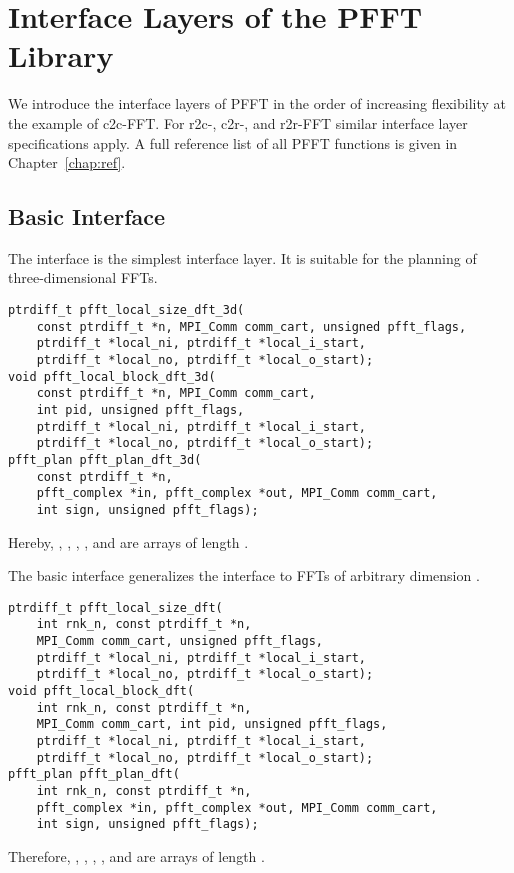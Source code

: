 \chapter{Interface Layers of the PFFT Library}\label{chap:api}
We introduce the interface layers of PFFT in the order of increasing flexibility at the example of c2c-FFT.
For r2c-, c2r-, and r2r-FFT similar interface layer specifications apply. A full reference list of all PFFT functions is given in Chapter~\ref{chap:ref}. 
\section{Basic Interface}
The  interface is the simplest interface layer. It is suitable for the planning of three-dimensional FFTs.
\begin{lstlisting}
ptrdiff_t pfft_local_size_dft_3d(
    const ptrdiff_t *n, MPI_Comm comm_cart, unsigned pfft_flags,
    ptrdiff_t *local_ni, ptrdiff_t *local_i_start,
    ptrdiff_t *local_no, ptrdiff_t *local_o_start);
void pfft_local_block_dft_3d(
    const ptrdiff_t *n, MPI_Comm comm_cart,
    int pid, unsigned pfft_flags,
    ptrdiff_t *local_ni, ptrdiff_t *local_i_start,
    ptrdiff_t *local_no, ptrdiff_t *local_o_start);
pfft_plan pfft_plan_dft_3d(
    const ptrdiff_t *n,
    pfft_complex *in, pfft_complex *out, MPI_Comm comm_cart,
    int sign, unsigned pfft_flags);
\end{lstlisting}
Hereby, , , , , and  are
 arrays of length .

The basic interface generalizes the  interface to FFTs of arbitrary dimension .
\begin{lstlisting}
ptrdiff_t pfft_local_size_dft(
    int rnk_n, const ptrdiff_t *n,
    MPI_Comm comm_cart, unsigned pfft_flags,
    ptrdiff_t *local_ni, ptrdiff_t *local_i_start,
    ptrdiff_t *local_no, ptrdiff_t *local_o_start);
void pfft_local_block_dft(
    int rnk_n, const ptrdiff_t *n,
    MPI_Comm comm_cart, int pid, unsigned pfft_flags,
    ptrdiff_t *local_ni, ptrdiff_t *local_i_start,
    ptrdiff_t *local_no, ptrdiff_t *local_o_start);
pfft_plan pfft_plan_dft(
    int rnk_n, const ptrdiff_t *n,
    pfft_complex *in, pfft_complex *out, MPI_Comm comm_cart,
    int sign, unsigned pfft_flags);
\end{lstlisting}
Therefore, , , , , and  are
 arrays of length .

